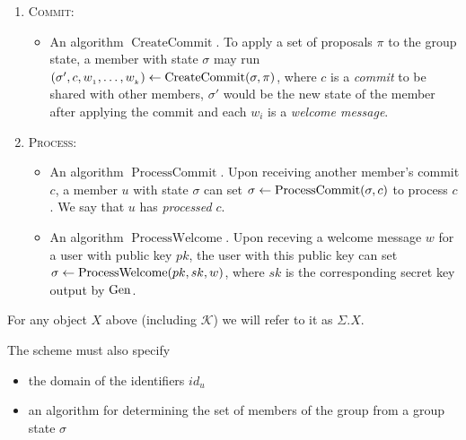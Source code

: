 \begin{definition}[PC-CGKA]
\begin{enumerate}[1.]
\begin{itemize}
			\end{itemize}
		\item[] \textsc{Commit:}
			\begin{itemize}
				\item An algorithm $\operatorname{CreateCommit}$. To apply a set of proposals $\pi$ to the group state, a member with state $\sigma$ may run $(\sigma', c, w_{_1}, \ldots, w_{_k}) \leftarrow \operatorname{CreateCommit}(\sigma, \pi)$, where $c$ is a \emph{commit} to be shared with other members, $\sigma'$ would be the new state of the member after applying the commit and each $w_{i}$ is a \emph{welcome message}.
			\end{itemize}
		\item[] \textsc{Process:}
			\begin{itemize}
				\item An algorithm $\operatorname{ProcessCommit}$. Upon receiving another member's commit $c$, a member $u$ with state $\sigma$ can set $\sigma \leftarrow \operatorname{ProcessCommit}(\sigma, c)$ to process $c$. We say that $u$ has \emph{processed} $c$.
				\item An algorithm $\operatorname{ProcessWelcome}$. Upon receving a welcome message $w$ for a user with public key $pk$, the user with this public key can set $\sigma \leftarrow \operatorname{ProcessWelcome}(pk, sk, w)$, where $sk$ is the corresponding secret key output by $\mathrm{Gen}$.
			\end{itemize}
	\end{enumerate}

	For any object $X$ above (including $\mathcal{K}$) we will refer to it as $\Sigma.X$.

	The scheme must also specify
	\begin{itemize}
		\item the domain of the identifiers $id_u$
		\item an algorithm for determining the set of members of the group from a group state $\sigma$
	\end{itemize}
\end{definition}

